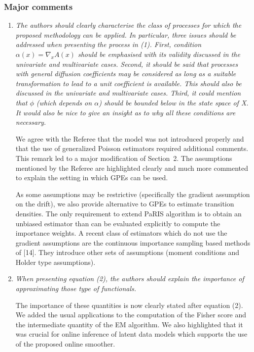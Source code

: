 \documentclass[12pt]{article}
\newcommand{\1}{\mathrm{1}}
\begin{document}
\subsubsection*{Major comments}
\begin{enumerate}
\item {\em 
The authors should clearly characterise the class of processes for which the proposed
methodology can be applied. In particular, three issues should be addressed when
presenting the process in (1). First, condition $\alpha(x) = \nabla_x A(x)$ should be emphasised
with its validity discussed in the univariate and multivariate cases. Second, it should
be said that processes with general diffusion coefficients may be considered as long
as a suitable transformation to lead to a unit coefficient is available. This should
also be discussed in the univariate and multivariate cases. Third, it could mention
that $\phi$ (which depends on $\alpha$) should be bounded below in the state space of X. It
would also be nice to give an insight as to why all these conditions are necessary.
}

\vspace{.3cm}

We agree with the Referee that the model was not introduced properly and that the use of generalized Poisson estimators required additional comments. This remark led to a major modification of Section~2. The assumptions mentioned by the Referee are highlighted clearly and much more commented to explain the setting in which GPEs can be used. 

As some assumptions may be restrictive (specifically the gradient assumption on the drift), we also provide alternative to GPEs to estimate transition densities. The only requirement to extend PaRIS algorithm is to obtain an unbiased estimator than can be evaluated explicitly to compute the importance weights. A recent class of estimators which do not use the gradient assumptions are the continuous importance sampling based methods of [14]. They introduce other sets of assumptions (moment conditions and Holder type assumptions). 


\item {\em When presenting equation (2), the authors should explain the importance of approximating those type of functionals.}

\vspace{.3cm}

The importance of these quantities is now clearly stated after equation (2). We added the usual applications to the computation of the Fisher score and the intermediate quantity of the EM algorithm. We also highlighted that it was crucial for online inference of latent data models which supports the use of the proposed online smoother.


\end{enumerate}
\end{document}
